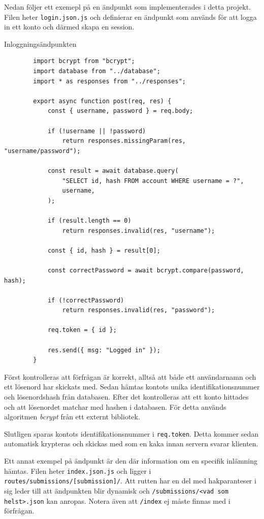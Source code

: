 \documentclass{article}
\begin{document}
Nedan följer ett exemepl på en ändpunkt som implementerades i detta projekt.
Filen heter \texttt{login.json.js} och definierar en ändpunkt som används för
att logga in ett konto och därmed skapa en session.

\begin{listing}[H]
	\caption{Inloggningsändpunkten}
	\begin{verbatim}
		import bcrypt from "bcrypt";
		import database from "../database";
		import * as responses from "../responses";

		export async function post(req, res) {
			const { username, password } = req.body;

			if (!username || !password)
				return responses.missingParam(res, "username/password");

			const result = await database.query(
				"SELECT id, hash FROM account WHERE username = ?",
				username,
			);

			if (result.length == 0)
				return responses.invalid(res, "username");

			const { id, hash } = result[0];

			const correctPassword = await bcrypt.compare(password, hash);

			if (!correctPassword)
				return responses.invalid(res, "password");

			req.token = { id };

			res.send({ msg: "Logged in" });
		}
	\end{verbatim}
\end{listing}

Först kontrolleras att förfrågan är korrekt, alltså att både ett användarnamn
och ett lösenord har skickats med. Sedan hämtas kontots unika
identifikationsnummer och lösenordshash från databasen. Efter det kontrolleras
att ett konto hittades och att lösenordet matchar med hashen i databasen. För
detta används algoritmen \textit{bcrypt} från ett externt bibliotek.

Slutligen sparas kontots identifikationsnummer i \texttt{req.token}. Detta
kommer sedan automatisk krypteras och skickas med som en kaka innan servern
svarar klienten.

Ett annat exempel på ändpunkt är den där information om en specifik inlämning
hämtas. Filen heter \texttt{index.json.js} och ligger i \\
\texttt{routes/submissions/[submission]/}. Att rutten har en del med
hakparanteser i sig leder till att ändpunkten blir dynamisk och
\texttt{/submissions/<vad som helst>.json} kan anropas. Notera även att
\texttt{/index} ej måste finnas med i förfrågan.
\end{document}
